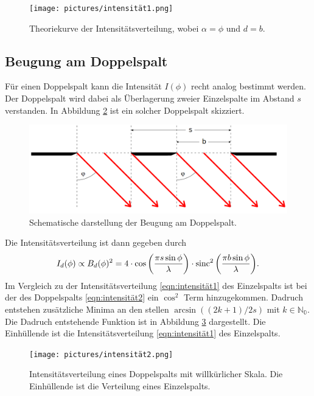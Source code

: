 \begin{figure}[H]
    \centering
    \texttt{[image: pictures/intensität1.png]}
    \caption{Theoriekurve der Intensitätsverteilung, wobei $\alpha=\phi$ und $d=b$. \cite{AP03}}
    \label{fig:frauenhofer2}
\end{figure}

\subsection{Beugung am Doppelspalt}
\label{sec:doppel}
Für einen Doppelspalt kann die Intensität $I(\phi)$ recht analog bestimmt werden. Der Doppelspalt wird dabei als Überlagerung zweier Einzelspalte im
Abstand $s$ verstanden. In Abbildung \ref{fig:doppel} ist ein solcher Doppelspalt skizziert.
\begin{figure}[H]
    \centering
    \includegraphics[scale = 0.4]{pictures/doppel.png}
    \caption{Schematische darstellung der Beugung am Doppelspalt. \cite{AP01}}
    \label{fig:doppel}
\end{figure}

\noindent
Die Intensitätsverteilung ist dann gegeben durch
\begin{equation}
    I_d(\phi)\propto B_d(\phi)^2
    =4\cdot \cos{\left(\frac{\pi s\sin{\phi}}{\lambda}\right)}\cdot \operatorname{sinc}^2{\left(\frac{\pi b \sin{\phi}}{\lambda}\right)}  .
    \label{eqn:intensität2}
\end{equation}
Im Vergleich zu der Intensitätsverteilung \eqref{eqn:intensität1} des Einzelspalts ist bei der des Doppelspalts \eqref{eqn:intensität2} ein
$\cos^2$ Term hinzugekommen. Dadruch entstehen zusätzliche Minima an den stellen $\arcsin{((2k+1)/2s)}$ mit $k\in\mathbb{N_0}$. Die Dadruch
entstehende Funktion ist in Abbildung \ref{fig:intensität2} dargestellt. Die Einhüllende ist die Intensitätsverteilung \ref{eqn:intensität1}
des Einzelspalts.
\begin{figure}[H]
    \centering
    \texttt{[image: pictures/intensität2.png]}
    \caption{Intensitätsverteilung eines Doppelspalts mit willkürlicher Skala. Die Einhüllende ist die Verteilung eines Einzelspalts. \cite{AP04}}
    \label{fig:intensität2}
\end{figure}

